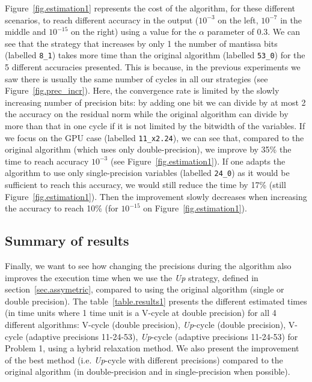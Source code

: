    Figure~\ref{fig.estimation1} represents the cost of the algorithm, for these different scenarios, to reach different accuracy in the output ($10^{-3}$ on the left, $10^{-7}$ in the middle and $10^{-15}$ on the right) using
   a value for the $\alpha$ parameter of 0.3. We can see that the strategy that increases by only 1 the number of mantissa bits (labelled \texttt{8\_1}) takes more time than the original algorithm (labelled \texttt{53\_0}) for the 5 different accuracies presented. This is because, in the previous experiments we saw
   there is usually the same number of cycles in all our strategies (see Figure~\ref{fig.prec_incr}). Here, the convergence rate is limited by the slowly increasing number of precision bits: by adding one bit we can divide by at most 2 the 
   accuracy on the residual norm while the original algorithm can divide by more than that in one cycle if it is not limited by the bitwidth of the variables.
   If we focus on the GPU case (labelled \texttt{11\_x2.24}), we can see that, compared to the original algorithm (which uses only double-precision), we improve by 35\% the time to reach 
   accuracy $10^{-3}$ (see Figure~\ref{fig.estimation1}). If one adapts the algorithm to use only single-precision variables (labelled \texttt{24\_0}) as it would be sufficient to reach this accuracy, we would still reduce the time by 17\% (still Figure~\ref{fig.estimation1}). Then the improvement slowly decreases when increasing the accuracy to reach 10\% (for $10^{-15}$ on Figure~\ref{fig.estimation1}).
   
   \subsection{Summary of results}
   
   Finally, we want to see how changing the precisions during the algorithm also improves the execution time when we use the \emph{Up} strategy, defined in section~\ref{sec.assymetric}, compared to using the original algorithm (single or double precision).
   The table~\ref{table.results1} presents the different estimated times (in time units where 1 time unit is a V-cycle at double precision)
   for all 4 different algorithms: V-cycle (double precision), \emph{Up}-cycle (double precision), V-cycle (adaptive precisions 11-24-53), \emph{Up}-cycle (adaptive precisions 11-24-53) for Problem 1, using a hybrid relaxation method.
   We also present the improvement of the best method (i.e. \emph{Up}-cycle with different precisions) compared to the original algorithm (in double-precision and in single-precision when possible).
  
